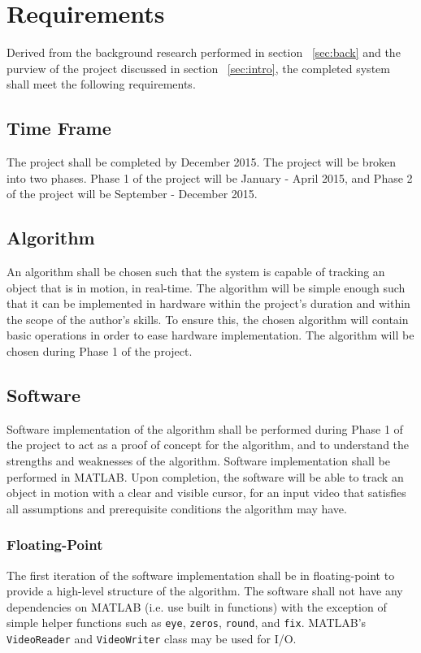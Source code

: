 \documentclass[12pt]{article} %
\begin{document}
\section{Requirements}
Derived from the background research performed in section ~\ref{sec:back} and the purview of the project discussed in section ~\ref{sec:intro}, the completed system shall meet the following requirements.
\subsection{Time Frame}
The project shall be completed by December 2015. The project will be broken into two phases. Phase 1 of the project will be January - April 2015, and Phase 2 of the project will be September - December 2015.
\subsection{Algorithm}
An algorithm shall be chosen such that the system is capable of tracking an object that is in motion, in real-time. The algorithm will be simple enough such that it can be implemented in hardware within the project's duration and within the scope of the author's skills. To ensure this, the chosen algorithm will contain basic operations in order to ease hardware implementation. The algorithm will be chosen during Phase 1 of the project.
\subsection{Software}
Software implementation of the algorithm shall be performed during Phase 1 of the project to act as a proof of concept for the algorithm, and to understand the strengths and weaknesses of the algorithm. Software implementation shall be performed in MATLAB. Upon completion, the software will be able to track an object in motion with a clear and visible cursor, for an input video that satisfies all assumptions and prerequisite conditions the algorithm may have. 
\subsubsection{Floating-Point}
The first iteration of the software implementation shall be in floating-point to provide a high-level structure of the algorithm. The software shall not have any dependencies on MATLAB (i.e. use built in functions) with the exception of simple helper functions such as \texttt{eye}, \texttt{zeros}, \texttt{round}, and \texttt{fix}. MATLAB's \texttt{VideoReader} and \texttt{VideoWriter} class may be used for I/O.
\end{document}

